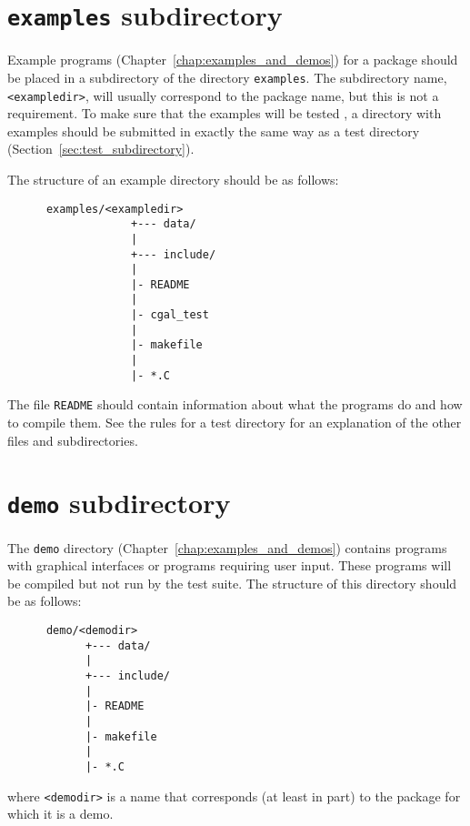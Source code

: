 \section{{\tt examples} subdirectory}
\label{sec:examples_subdirectory}

Example programs (Chapter~\ref{chap:examples_and_demos}) for a package should 
be placed in a subdirectory of the directory {\tt examples}. 
The subdirectory name, \verb|<exampledir>|, will usually correspond to the 
package name, but this is not a requirement.
To make sure that the examples will be tested%
, 
a directory with examples 
should be submitted in exactly the same way as a test directory 
(Section~\ref{sec:test_subdirectory}). 

The structure of an example directory should be as follows: 
\begin{verbatim}
      examples/<exampledir>
                   +--- data/
                   |
                   +--- include/
                   |
                   |- README
                   |
                   |- cgal_test
                   |
                   |- makefile
                   |
                   |- *.C
\end{verbatim}

The file {\tt README} should contain information about what the programs do
and how to compile them. 
See the rules for a test directory for an explanation of the other files 
and subdirectories. 

\section{{\tt demo} subdirectory}
\label{sec:demo_subdirectory}

The {\tt demo} directory (Chapter~\ref{chap:examples_and_demos}) contains 
programs with graphical interfaces or programs requiring user input. These 
programs will be compiled but not run by the test suite.
The structure of this directory should be as follows: 
\begin{verbatim}
      demo/<demodir>
            +--- data/
            |
            +--- include/
            |
            |- README
            |
            |- makefile
            |
            |- *.C
\end{verbatim}
where \verb|<demodir>| is a name that corresponds (at least in part) to
the package for which it is a demo.

